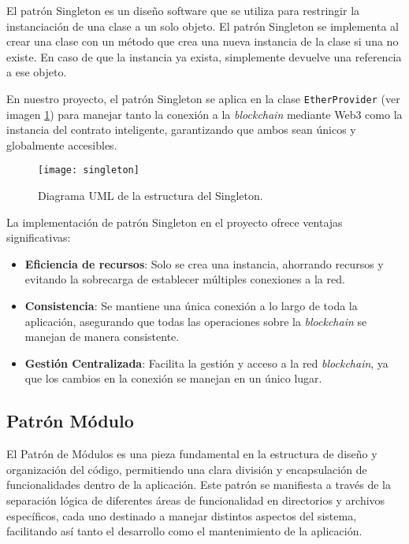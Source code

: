 El patrón Singleton es un diseño software que se utiliza para restringir la instanciación de una clase a un solo objeto. El patrón Singleton se implementa al crear una clase con un método que crea una nueva instancia de la clase si una no existe. En caso de que la instancia ya exista, simplemente devuelve una referencia a ese objeto.

En nuestro proyecto, el patrón Singleton se aplica en la clase \texttt{EtherProvider} (ver imagen \ref{img:singleton}) para manejar tanto la conexión a la \textit{blockchain} mediante Web3 como la instancia del contrato inteligente, garantizando que ambos sean únicos y globalmente accesibles.

\begin{figure}[h]
	\label{img:singleton}
	\centering
	\texttt{[image: singleton]}
	\caption[Diagrama Singleton]{Diagrama UML de la estructura del Singleton.}
\end{figure}

La implementación de patrón Singleton en el proyecto ofrece ventajas significativas: 

\begin{itemize}
\item \textbf{Eficiencia de recursos}: Solo se crea una instancia, ahorrando recursos y evitando la sobrecarga de establecer múltiples conexiones a la red.

\item \textbf{Consistencia}: Se mantiene una única conexión a lo largo de toda la aplicación, asegurando que todas las operaciones sobre la \textit{blockchain} se manejan de manera consistente.

\item \textbf{Gestión Centralizada}: Facilita la gestión y acceso a la red \textit{blockchain}, ya que los cambios en la conexión se manejan en un único lugar.
\end{itemize}

\subsection{Patrón Módulo}

El Patrón de Módulos es una pieza fundamental en la estructura de diseño y organización del código, permitiendo una clara división y encapsulación de funcionalidades dentro de la aplicación. Este patrón se manifiesta a través de la separación lógica de diferentes áreas de funcionalidad en directorios y archivos específicos, cada uno destinado a manejar distintos aspectos del sistema, facilitando así tanto el desarrollo como el mantenimiento de la aplicación.

